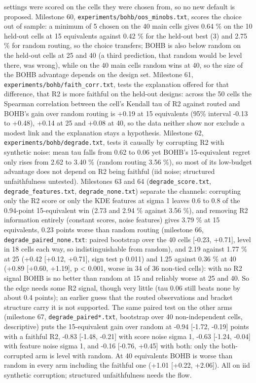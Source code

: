 \documentclass[conference]{IEEEtran}
\begin{document}
settings were scored on the cells they were chosen from, so no new
default is proposed. Milestone 60,
\texttt{experiments/\allowbreak{}bohb/\allowbreak{}oos\_\allowbreak{}minobs.txt}, scores the choice out of
sample: a minimum of 5 chosen on the 40 main cells gives 0.64 \% on the
10 held-out cells at 15 equivalents against 0.42 \% for the held-out
best (3) and 2.75 \% for random routing, so the choice transfers; BOHB
is also below random on the held-out cells at 25 and 40 (a third
prediction, that random would be level there, was wrong), while on the
40 main cells random wins at 40, so the size of the BOHB advantage
depends on the design set. Milestone 61,
\texttt{experiments/\allowbreak{}bohb/\allowbreak{}faith\_\allowbreak{}corr.txt}, tests the explanation offered
for that difference, that R2 is more faithful on the held-out designs:
across the 50 cells the Spearman correlation between the cell's Kendall
tau of R2 against routed and BOHB's gain over random routing is +0.19 at
15 equivalents (95\% interval -0.13 to +0.48), +0.14 at 25 and +0.08 at
40, so the data neither show nor exclude a modest link and the
explanation stays a hypothesis. Milestone 62,
\texttt{experiments/\allowbreak{}bohb/\allowbreak{}degrade.txt}, tests it causally by corrupting
R2 with synthetic noise: mean tau falls from 0.62 to 0.06 yet BOHB's
15-equivalent regret only rises from 2.62 to 3.40 \% (random routing
3.56 \%), so most of its low-budget advantage does not depend on R2
being faithful (iid noise; structured unfaithfulness untested).
Milestones 63 and 64 (\texttt{degrade\_\allowbreak{}score.txt},
\texttt{degrade\_\allowbreak{}features.txt}, \texttt{degrade\_\allowbreak{}none.txt}) separate the
channels: corrupting only the R2 score or only the KDE features at sigma
1 leaves 0.6 to 0.8 of the 0.94-point 15-equivalent win (2.73 and 2.94
\% against 3.56 \%), and removing R2 information entirely (constant
scores, noise features) gives 3.79 \% at 15 equivalents, 0.23 points
worse than random routing (milestone 66,
\texttt{degrade\_\allowbreak{}paired\_\allowbreak{}none.txt}: paired bootstrap over the 40 cells
{[}-0.23, +0.71{]}, level in 18 cells each way, so indistinguishable
from random), and 2.19 against 1.77 \% at 25 (+0.42 {[}+0.12, +0.71{]},
sign test p 0.011) and 1.25 against 0.36 \% at 40 (+0.89 {[}+0.60,
+1.19{]}, p \textless{} 0.001, worse in 34 of 36 non-tied cells): with
no R2 signal BOHB is no better than random at 15 and reliably worse at
25 and 40. So the edge needs some R2 signal, though very little (tau
0.06 still beats none by about 0.4 points); an earlier guess that the
routed observations and bracket structure carry it is not supported. The
same paired test on the other arms (milestone 67,
\texttt{degrade\_\allowbreak{}paired*.txt}, bootstrap over 40 non-independent cells,
descriptive) puts the 15-equivalent gain over random at -0.94 {[}-1.72,
-0.19{]} points with a faithful R2, -0.83 {[}-1.48, -0.21{]} with score
noise sigma 1, -0.63 {[}-1.24, -0.04{]} with feature noise sigma 1, and
-0.16 {[}-0.76, +0.45{]} with both: only the both-corrupted arm is level
with random. At 40 equivalents BOHB is worse than random in every arm
including the faithful one (+1.01 {[}+0.22, +2.06{]}). All on iid
synthetic corruption; structured unfaithfulness needs the flow.
\end{document}

